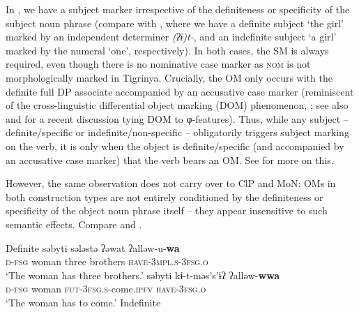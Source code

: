 \documentclass[output=paper]{langscibook}
\begin{document}
In , we have a subject marker irrespective of the definiteness or specificity of the subject noun phrase (compare  with , where we have a definite subject `the girl' marked by an independent determiner \emph{(ʔɨ)t-}, and an indefinite subject `a girl' marked by the numeral `one', respectively). In both cases, the SM is always required, even though there is no nominative case marker as {\scshape nom} is not morphologically marked in Tigrinya. Crucially, the OM only occurs with the definite full DP associate accompanied by an accusative case marker (reminiscent of the cross-linguistic differential object marking (DOM) phenomenon, \citealt{aissen03}; see also \citealt{danon2011} and \citealt{kalin16} for a recent discussion tying DOM to φ-features).
Thus, while any subject -- definite/specific  or indefinite/non-specific  -- obligatorily triggers subject marking on the verb, it is only when the object is definite/specific (and accompanied by an accusative case marker) that the verb bears an OM. See  for more on this.

However, the same observation does not carry over to ClP and MoN: OMs in both construction types are not entirely conditioned by the definiteness or specificity of the object noun phrase itself -- they appear insensitive to such semantic effects.
Compare  and .  

\ea\label{ex:Gebregziabher:modnessdef}Definite 
\ea 
{} səbyti sələstə ʔə\textcrh wat ʔalləw-u-{\textbf{wa}}  \\
{\scshape d-fsg} woman three brothers {\scshape have-3mpl.s-3fsg.o}\\
\glt `The woman has three brothers.'
\ex 
{} səbyti kɨ-t-məs's'ɨʔ ʔalləw-{\textbf{wwa}} \\
{\scshape d-fsg} woman {\scshape fut-3fsg.s}-come.{\scshape ipfv} {\scshape have-3fsg.o}\\
\glt `The woman has to come.'
\z
\ex\label{ex:Gebregziabher:modnessindef}Indefinite 
\z
\z
\end{document}
